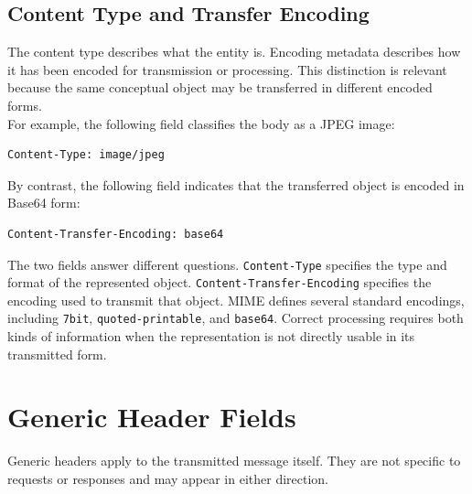 \documentclass{scrbook}
\begin{document}
\subsection{Content Type and Transfer Encoding}

The content type describes what the entity is. Encoding metadata describes how it has been encoded for transmission or processing. This distinction is relevant because the same conceptual object may be transferred in different encoded forms.\\

For example, the following field classifies the body as a JPEG image:

\begin{lstlisting}
Content-Type: image/jpeg
\end{lstlisting}

By contrast, the following field indicates that the transferred object is encoded in Base64 form:

\begin{lstlisting}
Content-Transfer-Encoding: base64
\end{lstlisting}

The two fields answer different questions. \texttt{Content-Type} specifies the type and format of the represented object. \texttt{Content-Transfer-Encoding} specifies the encoding used to transmit that object. MIME defines several standard encodings, including \texttt{7bit}, \texttt{quoted-printable}, and \texttt{base64}. Correct processing requires both kinds of information when the representation is not directly usable in its transmitted form.

\newpage
\section{Generic Header Fields}

Generic headers apply to the transmitted message itself. They are not specific to requests or responses and may appear in either direction.
\end{document}
